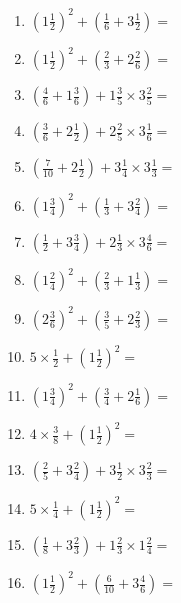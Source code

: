 \documentclass[12pt]{article}
\begin{document}
\begin{enumerate}
\item \large $ (1 \frac{1}{2})^2 + (\frac{1}{6} + 3 \frac{1}{2}) = $ \vspace{1.8cm}
\item \large $ (1 \frac{1}{2})^2 + (\frac{2}{3} + 2 \frac{2}{6}) = $ \vspace{1.8cm}
\item \large $ (\frac{4}{6} + 1 \frac{3}{6}) + 1 \frac{3}{5} \times 3 \frac{2}{5} = $ \vspace{1.8cm}
\item \large $ (\frac{3}{6} + 2 \frac{1}{2}) + 2 \frac{2}{5} \times 3 \frac{1}{6} = $ \vspace{1.8cm}
\newpage
\item \large $ (\frac{7}{10} + 2 \frac{1}{2}) + 3 \frac{1}{4} \times 3 \frac{1}{3} = $ \vspace{1.8cm}
\item \large $ (1 \frac{3}{4})^2 + (\frac{1}{3} + 3 \frac{2}{4}) = $ \vspace{1.8cm}
\item \large $ (\frac{1}{2} + 3 \frac{3}{4}) + 2 \frac{1}{3} \times 3 \frac{4}{6} = $ \vspace{1.8cm}
\item \large $ (1 \frac{2}{4})^2 + (\frac{2}{3} + 1 \frac{1}{3}) = $ \vspace{1.8cm}
\item \large $ (2 \frac{3}{6})^2 + (\frac{3}{5} + 2 \frac{2}{3}) = $ \vspace{1.8cm}
\item \large $ 5 \times \frac{1}{2} + (1 \frac{1}{2})^2 = $ \vspace{1.8cm}
\item \large $ (1 \frac{3}{4})^2 + (\frac{3}{4} + 2 \frac{1}{6}) = $ \vspace{1.8cm}
\item \large $ 4 \times \frac{3}{8} + (1 \frac{1}{2})^2 = $ \vspace{1.8cm}
\item \large $ (\frac{2}{5} + 3 \frac{2}{4}) + 3 \frac{1}{2} \times 3 \frac{2}{3} = $ \vspace{1.8cm}
\item \large $ 5 \times \frac{1}{4} + (1 \frac{1}{2})^2 = $ \vspace{1.8cm}
\newpage
\item \large $ (\frac{1}{8} + 3 \frac{2}{3}) + 1 \frac{2}{3} \times 1 \frac{2}{4} = $ \vspace{1.8cm}
\item \large $ (1 \frac{1}{2})^2 + (\frac{6}{10} + 3 \frac{4}{6}) = $ \vspace{1.8cm}

\end{enumerate}
\end{document}
